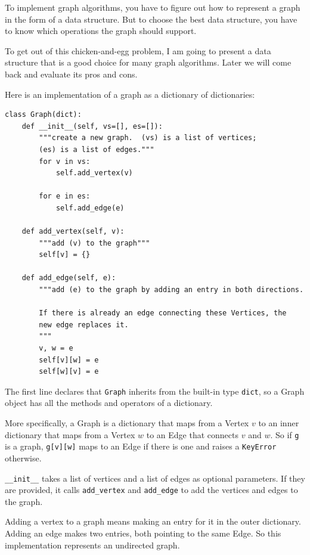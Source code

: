 \documentclass[10pt]{book}
\begin{document}
To implement graph algorithms, you have to figure
out how to represent a graph in the form of a data structure.
But to choose the best data structure, you have to know which
operations the graph should support.

To get out of this chicken-and-egg problem, I am going to present
a data structure that is a good choice for many graph algorithms.
Later we will come back and evaluate its pros and cons.

Here is an implementation of a graph as a dictionary of dictionaries:
%
\begin{verbatim}
class Graph(dict):
    def __init__(self, vs=[], es=[]):
        """create a new graph.  (vs) is a list of vertices;
        (es) is a list of edges."""
        for v in vs:
            self.add_vertex(v)

        for e in es:
            self.add_edge(e)

    def add_vertex(self, v):
        """add (v) to the graph"""
        self[v] = {}

    def add_edge(self, e):
        """add (e) to the graph by adding an entry in both directions.

        If there is already an edge connecting these Vertices, the
        new edge replaces it.
        """
        v, w = e
        self[v][w] = e
        self[w][v] = e
\end{verbatim}
%
The first line declares that {\tt Graph} inherits from the built-in
type {\tt dict}, so a Graph object has all the methods and operators
of a dictionary.

More specifically, a Graph is a dictionary that maps from
a Vertex $v$ to an inner dictionary that maps from a Vertex $w$
to an Edge that connects $v$ and $w$.  So if {\tt g} is a graph,
{\tt g[v][w]} maps to an Edge if there is one and raises
a {\tt KeyError} otherwise.

\verb"__init__" takes a list of vertices and a list of
edges as optional parameters.  If they are provided, it calls
\verb"add_vertex" and \verb"add_edge" to add the vertices and edges to
the graph.

Adding a vertex to a graph means making an entry for it in the
outer dictionary.  Adding an edge makes two entries, both pointing
to the same Edge.  So this implementation represents an undirected
graph.
\end{document}
